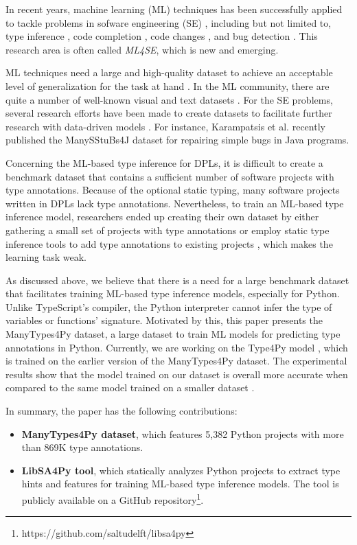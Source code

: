 \documentclass[10pt, conference]{IEEEtran}
\begin{document}
In recent years, machine learning (ML) techniques has been successfully applied to tackle problems in sofware engineering (SE) \cite{allamanis2018survey}, including but not limited to, type inference \cite{allamanis2020typilus, pradel2019typewriter}, code completion \cite{svyatkovskiy2019pythia}, code changes \cite{tufano2019learning}, and bug detection \cite{qiao2020deep}. This research area is often called \textit{ML4SE}, which is new and emerging.

ML techniques need a large and high-quality dataset to achieve an acceptable level of generalization for the task at hand \cite{sun2017revisiting}. In the ML community, there are quite a number of well-known visual and text datasets \cite{pouyanfar2018survey}. For the SE problems, several research efforts have been made to create datasets to facilitate further research with data-driven models \cite{githubCorpus2013}. For instance, Karampatsis et al. \cite{karampatsis2020often} recently published the ManySStuBs4J dataset for repairing simple bugs in Java programs. 

Concerning the ML-based type inference for DPLs, it is difficult to create a benchmark dataset that contains a sufficient number of software projects with type annotations. Because of the optional static typing, many software projects written in DPLs lack type annotations. Nevertheless, to train an ML-based type inference model, researchers ended up creating their own dataset by either gathering a small set of projects with type annotations \cite{pradel2019typewriter} or employ static type inference tools to add type annotations to existing projects \cite{allamanis2020typilus}, which makes the learning task weak.

As discussed above, we believe that there is a need for a large benchmark dataset that facilitates training ML-based type inference models, especially for Python. Unlike TypeScript's compiler, the Python interpreter cannot infer the type of variables or functions' signature. Motivated by this, this paper presents the ManyTypes4Py dataset, a large dataset to train ML models for predicting type annotations in Python. Currently, we are working on the Type4Py model \cite{mir2021type4py}, which is trained on the earlier version of the ManyTypes4Py dataset. The experimental results show that the model trained on our dataset is overall more accurate when compared to the same model trained on a smaller dataset \cite{mir2021type4py}.

In summary, the paper has the following contributions:
\begin{itemize}
	\item \textbf{ManyTypes4Py dataset}, which features 5,382 Python projects with more than 869K type annotations.
	\item \textbf{LibSA4Py tool}, which statically analyzes Python projects to extract type hints and features for training ML-based type inference models. The tool is publicly available on a GitHub repository\footnote{https://github.com/saltudelft/libsa4py}.
\end{itemize}
\end{document}
